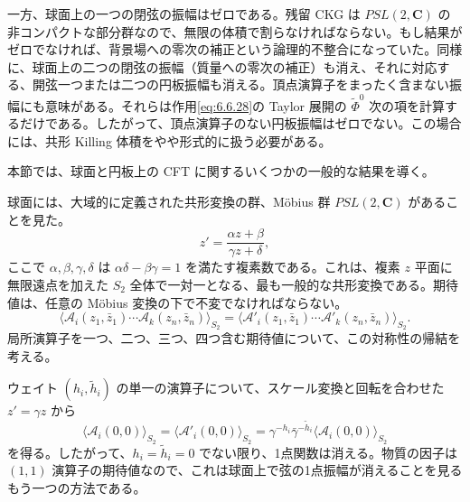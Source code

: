 一方、球面上の一つの閉弦の振幅はゼロである。残留 CKG は $PSL(2,\mathbf C)$ の非コンパクトな部分群なので、無限の体積で割らなければならない。もし結果がゼロでなければ、背景場への零次の補正という論理的不整合になっていた。同様に、球面上の二つの閉弦の振幅（質量への零次の補正）も消え、それに対応する、開弦一つまたは二つの円板振幅も消える。頂点演算子をまったく含まない振幅にも意味がある。それらは作用\eqref{eq:6.6.28}の Taylor 展開の $\widetilde\Phi^0$ 次の項を計算するだけである。したがって、頂点演算子のない円板振幅はゼロでない。この場合には、共形 Killing 体積をやや形式的に扱う必要がある。

\label{sec:6.7}

本節では、球面と円板上の CFT に関するいくつかの一般的な結果を導く。


球面には、大域的に定義された共形変換の群、Möbius 群 $PSL(2,\mathbf C)$ があることを見た。
\begin{equation}
z'=\frac{\alpha z+\beta}{\gamma z+\delta},
\tag{6.7.1}\label{eq:6.7.1}
\end{equation}
ここで $\alpha,\beta,\gamma,\delta$ は $\alpha\delta-\beta\gamma=1$ を満たす複素数である。これは、複素 $z$ 平面に無限遠点を加えた $S_2$ 全体で一対一となる、最も一般的な共形変換である。期待値は、任意の Möbius 変換の下で不変でなければならない。
\begin{equation}
\langle\mathcal A_i(z_1,\bar z_1)\cdots\mathcal A_k(z_n,\bar z_n)\rangle_{S_2}
=\langle\mathcal A'_i(z_1,\bar z_1)\cdots\mathcal A'_k(z_n,\bar z_n)\rangle_{S_2}.
\tag{6.7.2}\label{eq:6.7.2}
\end{equation}
局所演算子を一つ、二つ、三つ、四つ含む期待値について、この対称性の帰結を考える。

ウェイト $(h_i,\widetilde h_i)$ の単一の演算子について、スケール変換と回転を合わせた $z'=\gamma z$ から
\begin{equation}
\langle\mathcal A_i(0,0)\rangle_{S_2}
=\langle\mathcal A'_i(0,0)\rangle_{S_2}
=\gamma^{-h_i}\bar\gamma^{-\widetilde h_i}
\langle\mathcal A_i(0,0)\rangle_{S_2}
\tag{6.7.3}\label{eq:6.7.3}
\end{equation}
を得る。したがって、$h_i=\widetilde h_i=0$ でない限り、1点関数は消える。物質の因子は $(1,1)$ 演算子の期待値なので、これは球面上で弦の1点振幅が消えることを見るもう一つの方法である。

